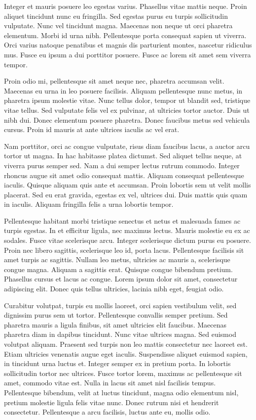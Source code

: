 \documentclass{homework}
\begin{document}
Integer et mauris posuere leo egestas varius. Phasellus vitae mattis neque. Proin aliquet tincidunt nunc eu fringilla. Sed egestas purus eu turpis sollicitudin vulputate. Nunc vel tincidunt magna. Maecenas non neque ut orci pharetra elementum. Morbi id urna nibh. Pellentesque porta consequat sapien ut viverra. Orci varius natoque penatibus et magnis dis parturient montes, nascetur ridiculus mus. Fusce eu ipsum a dui porttitor posuere. Fusce ac lorem sit amet sem viverra tempor.

Proin odio mi, pellentesque sit amet neque nec, pharetra accumsan velit. Maecenas eu urna in leo posuere facilisis. Aliquam pellentesque nunc metus, in pharetra ipsum molestie vitae. Nunc tellus dolor, tempor ut blandit sed, tristique vitae tellus. Sed vulputate felis vel ex pulvinar, at ultricies tortor auctor. Duis ut nibh dui. Donec elementum posuere pharetra. Donec faucibus metus sed vehicula cursus. Proin id mauris at ante ultrices iaculis ac vel erat.

Nam porttitor, orci ac congue vulputate, risus diam faucibus lacus, a auctor arcu tortor ut magna. In hac habitasse platea dictumst. Sed aliquet tellus neque, at viverra purus semper sed. Nam a dui semper lectus rutrum commodo. Integer rhoncus augue sit amet odio consequat mattis. Aliquam consequat pellentesque iaculis. Quisque aliquam quis ante et accumsan. Proin lobortis sem ut velit mollis placerat. Sed eu erat gravida, egestas ex vel, ultrices dui. Duis mattis quis quam in iaculis. Aliquam fringilla felis a urna lobortis tempor.

Pellentesque habitant morbi tristique senectus et netus et malesuada fames ac turpis egestas. In et efficitur ligula, nec maximus lectus. Mauris molestie eu ex ac sodales. Fusce vitae scelerisque arcu. Integer scelerisque dictum purus eu posuere. Proin nec libero sagittis, scelerisque leo id, porta lacus. Pellentesque facilisis sit amet turpis ac sagittis. Nullam leo metus, ultricies ac mauris a, scelerisque congue magna. Aliquam a sagittis erat. Quisque congue bibendum pretium. Phasellus cursus et lacus ac congue. Lorem ipsum dolor sit amet, consectetur adipiscing elit. Donec quis tellus ultricies, lacinia nibh eget, feugiat odio.

Curabitur volutpat, turpis eu mollis laoreet, orci sapien vestibulum velit, sed dignissim purus sem ut tortor. Pellentesque convallis semper pretium. Sed pharetra mauris a ligula finibus, sit amet ultricies elit faucibus. Maecenas pharetra diam in dapibus tincidunt. Nunc vitae ultrices magna. Sed euismod volutpat aliquam. Praesent sed turpis non leo mattis consectetur nec laoreet est. Etiam ultricies venenatis augue eget iaculis. Suspendisse aliquet euismod sapien, in tincidunt urna luctus et. Integer semper ex in pretium porta. In lobortis sollicitudin tortor nec ultrices. Fusce tortor lorem, maximus ac pellentesque sit amet, commodo vitae est. Nulla in lacus sit amet nisl facilisis tempus. Pellentesque bibendum, velit at luctus tincidunt, magna odio elementum nisl, pretium molestie ligula felis vitae nunc. Donec rutrum nisi et hendrerit consectetur. Pellentesque a arcu facilisis, luctus ante eu, mollis odio.
\end{document}
